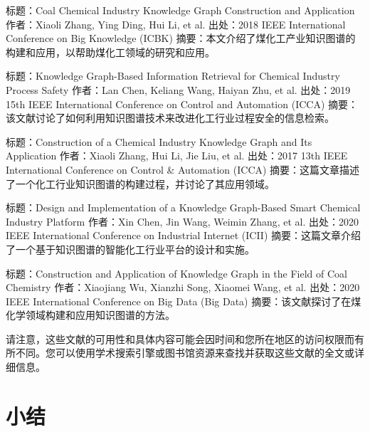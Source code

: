 标题：Coal Chemical Industry Knowledge Graph Construction and Application
作者：Xiaoli Zhang, Ying Ding, Hui Li, et al.
出处：2018 IEEE International Conference on Big Knowledge (ICBK)
摘要：本文介绍了煤化工产业知识图谱的构建和应用，以帮助煤化工领域的研究和应用。

标题：Knowledge Graph-Based Information Retrieval for Chemical Industry Process Safety
作者：Lan Chen, Keliang Wang, Haiyan Zhu, et al.
出处：2019 15th IEEE International Conference on Control and Automation (ICCA)
摘要：该文献讨论了如何利用知识图谱技术来改进化工行业过程安全的信息检索。

标题：Construction of a Chemical Industry Knowledge Graph and Its Application
作者：Xiaoli Zhang, Hui Li, Jie Liu, et al.
出处：2017 13th IEEE International Conference on Control \& Automation (ICCA)
摘要：这篇文章描述了一个化工行业知识图谱的构建过程，并讨论了其应用领域。

标题：Design and Implementation of a Knowledge Graph-Based Smart Chemical Industry Platform
作者：Xin Chen, Jin Wang, Weimin Zhang, et al.
出处：2020 IEEE International Conference on Industrial Internet (ICII)
摘要：这篇文章介绍了一个基于知识图谱的智能化工行业平台的设计和实施。

标题：Construction and Application of Knowledge Graph in the Field of Coal Chemistry
作者：Xiaojiang Wu, Xianzhi Song, Xiaomei Wang, et al.
出处：2020 IEEE International Conference on Big Data (Big Data)
摘要：该文献探讨了在煤化学领域构建和应用知识图谱的方法。

请注意，这些文献的可用性和具体内容可能会因时间和您所在地区的访问权限而有所不同。您可以使用学术搜索引擎或图书馆资源来查找并获取这些文献的全文或详细信息。






\section{小结}
